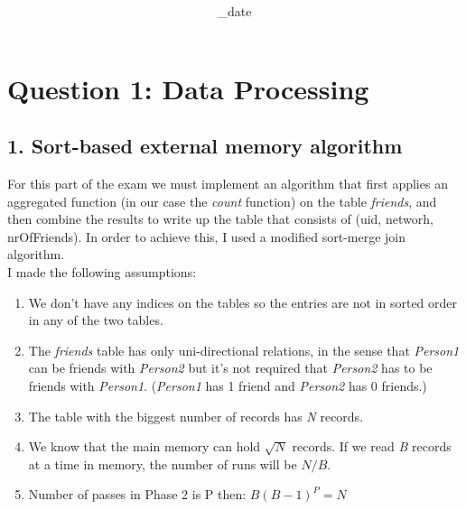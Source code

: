 \documentclass{article}      %
\title{\Course\\\Exam}
\author{\Studentname}
\date{\Sub_date}      %
\begin{document}

\maketitle                   %


\section*{Question 1: Data Processing} 

\subsection* {1. Sort-based external memory algorithm}

For this part of the exam we must implement an algorithm that first applies an aggregated function (in our case the \emph{count} function) on the table \emph{friends}, and then combine the results to write up the table that consists of (uid, networh, nrOfFriends). In order to achieve this, I used a modified sort-merge join algorithm.\\

I made the following assumptions:
\begin{enumerate}
\item
We don't have any indices on the tables so the entries are not in sorted order in any of the two tables.
\item  
The \emph{friends} table has only uni-directional relations, in the sense that \emph{Person1} can be friends with \emph{Person2} but it's not required that \emph{Person2} has to be friends with \emph{Person1}. (\emph{Person1} has 1 friend and \emph{Person2} has 0 friends.)
\item
The table with the biggest number of records has \emph{N} records.
\item
We know that the main memory can hold \begin{math}\sqrt{N}\end{math} records. If we read \emph{B} records at a time in memory, the number of runs will be \begin{math}N/B\end{math}.
\item 
Number of passes in Phase 2 is P then: \begin{math}B(B-1)^P = N\end{math}\\
 \end{enumerate}
\end{document}
